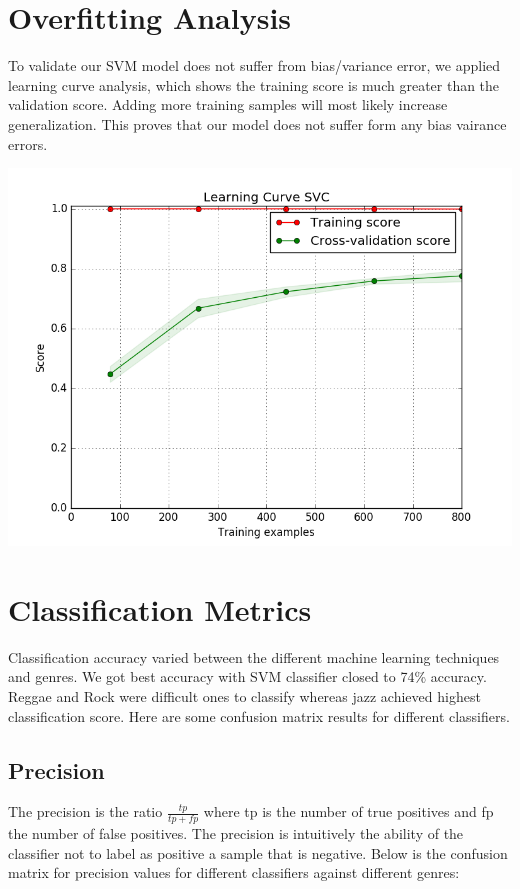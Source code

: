 \documentclass[conference]{IEEEtran}
\begin{document}
\section{Overfitting Analysis}
To validate our SVM model does not suffer from bias/variance error, we applied learning curve analysis, which shows the training score is much greater than the validation score. Adding more training samples will most likely increase generalization. This proves that our model does not suffer form any bias vairance errors. 

\includegraphics[width=\columnwidth]{learning}
\section{Classification Metrics}
Classification accuracy varied between the different machine learning techniques and genres. We got best accuracy with SVM classifier closed to 74\% accuracy. Reggae and Rock were difficult ones to classify whereas jazz achieved highest classification score. Here are some confusion matrix results for different classifiers. 
\subsection{Precision}
The precision is the ratio $\frac{tp}{tp + fp}$ where tp is the number of true positives and fp the number of false positives. The precision is intuitively the ability of the classifier not to label as positive a sample that is negative.
Below is the confusion matrix for precision values for different classifiers against different genres:
\end{document}
